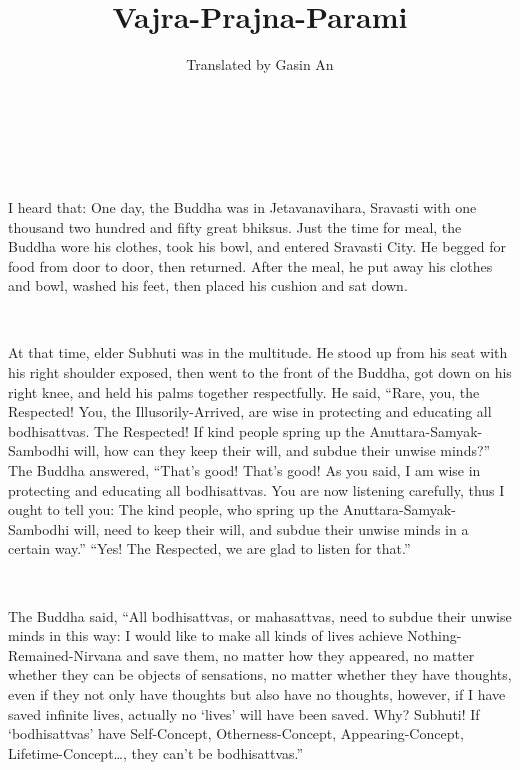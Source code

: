 \documentclass[a5paper,12pt]{book}
\title{Vajra-Prajna-Parami}
\author{Translated by Gasin An}
\date{}
\begin{document}
    \maketitle

    \pagestyle{empty}
    ~\newpage
    \pagestyle{headings}

    \setcounter{page}{1}

    ~

     I heard that: One day, the Buddha was in Jetavanavihara, Sravasti with one thousand two hundred and fifty great bhiksus. Just the time for meal, the Buddha wore his clothes, took his bowl, and entered Sravasti City. He begged for food from door to door, then returned. After the meal, he put away his clothes and bowl, washed his feet, then placed his cushion and sat down.

    ~

     At that time, elder Subhuti was in the multitude. He stood up from his seat with his right shoulder exposed, then went to the front of the Buddha, got down on his right knee, and held his palms together respectfully. He said, ``Rare, you, the Respected! You, the Illusorily-Arrived, are wise in protecting and educating all bodhisattvas. The Respected! If kind people spring up the Anuttara-Samyak-Sambodhi will, how can they keep their will, and subdue their unwise minds?'' The Buddha answered, ``That's good! That's good! As you said, I am wise in protecting and educating all bodhisattvas. You are now listening carefully, thus I ought to tell you: The kind people, who spring up the Anuttara-Samyak-Sambodhi will, need to keep their will, and subdue their unwise minds in a certain way.'' ``Yes! The Respected, we are glad to listen for that.''

    ~

     The Buddha said, ``All bodhisattvas, or mahasattvas, need to subdue their unwise minds in this way: I would like to make all kinds of lives achieve Nothing-Remained-Nirvana and save them, no matter how they appeared, no matter whether they can be objects of sensations, no matter whether they have thoughts, even if they not only have thoughts but also have no thoughts, however, if I have saved infinite lives, actually no `lives' will have been saved. Why? Subhuti! If `bodhisattvas' have Self-Concept, Otherness-Concept, Appearing-Concept, Lifetime-Concept\dots{}, they can't be bodhisattvas.''

    ~
\end{document}
